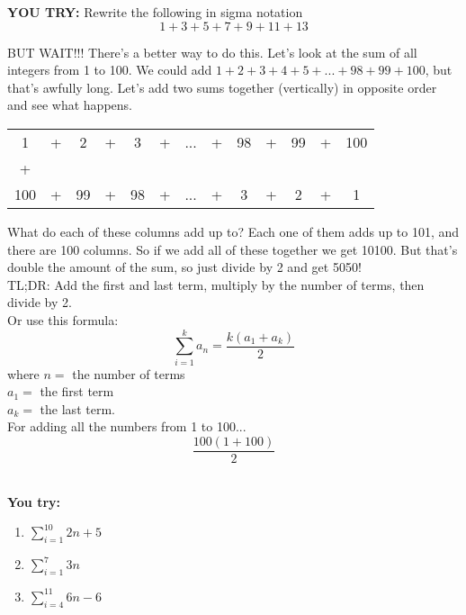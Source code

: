 \documentclass[12pt]{article}
\begin{document}
\textbf{YOU TRY:} Rewrite the following in sigma notation\\

$$1+3+5+7+9+11+13$$

BUT WAIT!!! There's a better way to do this. Let's look at the sum of all integers from 1 to 100. We could add $1+2+3+4+5+...+98+99+100$, but that's awfully long. Let's add two sums together (vertically) in opposite order and see what happens.

\begin{center}
\begin{tabular}{c c c c c c c c c c c c c}
1&+&2&+&3&+&...&+&98&+&99&+&100\\
+& & & & & & & & & & & &\\
100&+&99&+&98&+&...&+&3&+&2&+&1
\end{tabular}
\end{center}

What do each of these columns add up to? Each one of them adds up to 101, and there are 100 columns. So if we add all of these together we get 10100. But that's double the amount of the sum, so just divide by 2 and get 5050!\\

TL;DR: Add the first and last term, multiply by the number of terms, then divide by 2.\\

Or use this formula: $$\sum\limits_{i=1}^{k}a_n=\frac{k(a_1+a_k)}{2}$$ where $n=$ the number of terms\\ $a_1=$ the first term\\ $a_k=$ the last term.\\

For adding all the numbers from 1 to 100... $$\frac{100(1+100)}{2}$$\\

\begin{addmargin}[4em]{1em}

\textbf{You try:}\\

\begin{enumerate}

\item $\sum\limits_{i=1}^{10}2n+5$

\item $\sum\limits_{i=1}^{7}3n$

\item $\sum\limits_{i=4}^{11}6n-6$

\end{enumerate}

\end{addmargin}
\end{document}
